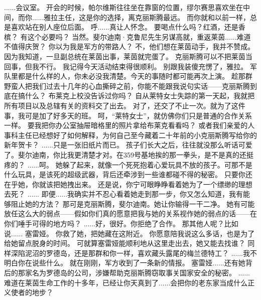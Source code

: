\documentclass[openany]{book}
\begin{document}
\begin{dialogue}
     ......会议室。
     开会的时候，帕尔维斯往往坐在靠窗的位置，缪尔赛思喜欢坐在中间，而你......雅拉主任，这是你的选择，离克丽斯腾最远。
     而你就和以前一样，总是喜欢站在别人座位后面。
     呼......真让人怀念。
     要喝点什么吗？红酒，还是香槟？
     有这个必要吗？
     当然。斐尔迪南·克鲁尼先生另谋高就，重返莱茵......难道不值得庆贺？
     你以为我是军方的带路人？
     不，他们想在莱茵动手，我并不赞成。因为我知道，一旦副总统在莱茵出事，莱茵就完蛋了。
     克丽斯腾可以不把莱茵当回事，但我不行。
     我记得今天活动结束得很顺利。
     别跟我装傻充愣了，雅拉。
     军队里都是什么样的人，你未必没我清楚。今天的事随时都可能再次上演。
     趁那群野蛮人把我们过去十几年的心血撕碎之前，你能不能跟我说句实话——克丽斯腾到底在搞什么？
     布莱克上校没告诉过你吗？
     自从莱特女士失踪的第一天起，我就把所有项目以及总辖有关的资料交了出去。
     对了，还交了不止一次。就为了这件事，我可是加了好多天的班。
     呵，“莱特女士”，就仿佛你们只是普通的合作关系一样。
     要我把你办公室抽屉暗格里的照片拿给布莱克看看吗？
     或者我们亲爱的人事科主任已经想好了如何解释，为何自己至今藏着二十年前的小克丽斯腾写给你的新年贺卡？
     ......只是一张旧纸片而已。
     孩子们长大之后，往往就没那么听话可爱了。斐尔迪南，你比我更清楚才对。在359号基地挨的那一拳头，是不是真的还挺疼的？
     ......呵。
     她躲了起来，就像一个死死抱着心爱玩具不放的孩子。可那不是什么玩具，是该死的超级武器，背后还牵涉到一些谁都碰不得的秘密。
     只要你还在乎她，你就该把她拽出来。
     还是说，你宁可眼睁睁看着她为了一个缥缈的理想去死？
     ......
     即便......我确实并不忍心看着她走到那一步，你又怎么知道，我有能够阻止她的方法？
     那可是克丽斯腾，斐尔迪南。她让你输得一干二净。
     她有可能放任这么大的弱点——假如你们真的愿意把我与她的关系视作她的弱点的话——在你们唾手可得的地方吗？
     ......好，很好。你拒绝了合作。
     那其他人呢？比如说......
     塞雷娅。
     你救了她，把她藏在这附近。
     你愿意陪我说这么多话，也是为了给她留点脱身的时间。
     可就算塞雷娅能顺利地从这里走出去，她又能去找谁？
     同样深陷泥沼的罗德岛，还是那群和你一样，喜欢藏头露尾的梅兰德特工？
     ......我不明白你在说些什么。
     就在刚刚，军方收到了一条新的情报。
     塞雷娅......还有她背后的那家名为罗德岛的公司，涉嫌帮助克丽斯腾窃取事关国家安全的秘密。
     ......
     难道在莱茵生命工作的十多年，已经让你天真到了......会把你的老东家当成什么正义使者的地步？
\end{dialogue}
\end{document}
